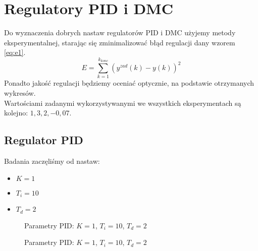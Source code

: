 \chapter{Regulatory PID i DMC}
Do wyznaczenia dobrych nastaw regulatorów PID i DMC użyjemy metody eksperymentalnej, starając się zminimalizować błąd regulacji dany wzorem \ref{eq:e1}.
\begin{equation} \label{eq:e1}
E = \sum_{k=1}^{k_{konc}} (y^{zad}(k)-y(k))^2
\end{equation}
Ponadto jakość regulacji będziemy oceniać optycznie, na podstawie otrzymanych wykresów. \\
Wartościami zadanymi wykorzystywanymi we wszystkich eksperymentach są kolejno: $1,3,2,-0,07$.

\section{Regulator PID}
Badania zaczęliśmy od nastaw:
\begin{itemize}
\item $K=1$
\item $T_i=10$
\item $T_d=2$
\end{itemize}

\begin{figure}[H]
\centering
{}
\caption{Parametry PID: $K=1$, $T_i=10$, $T_d=2$}
\label{fig:pid1_y}
\end{figure}

\begin{figure}[H]
\centering
{}
\caption{Parametry PID: $K=1$, $T_i=10$, $T_d=2$}
\label{fig:pid1_u}
\end{figure}

